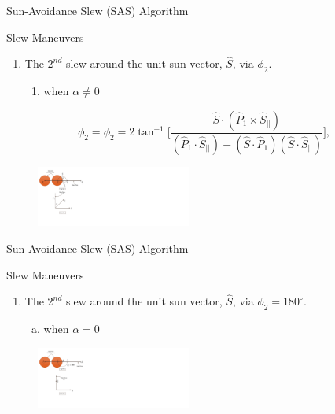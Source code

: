 \documentclass{beamer}
\begin{document}
\begin{frame}{Sun-Avoidance Slew (SAS) Algorithm}
\begin{block}{Slew Maneuvers}
\begin{enumerate}[2]
\item The $2^{nd}$ slew around the unit sun vector, $\hat{S}$, via $\phi_2$.
\begin{enumerate}[a]
\item when $\alpha\neq0$
\end{enumerate}
\end{enumerate}
\begin{equation}
\phi_2=\phi_2=2\tan^{-1}\Big[ \frac{\hat{S}\cdot (\hat{P}_1\times\hat{S}_{||})}{(\hat{P}_1\cdot\hat{S}_{||})-(\hat{S}\cdot\hat{P}_1)(\hat{S}\cdot\hat{S}_{||})}\Big],
\end{equation}
\begin{figure}
\includegraphics[width=2in]{./Figures/SVAS_2r_modified}
\end{figure}
\end{block}
\end{frame}
\begin{frame}{Sun-Avoidance Slew (SAS) Algorithm}
\begin{block}{Slew Maneuvers}
\begin{enumerate}[2]
\item The $2^{nd}$ slew around the unit sun vector, $\hat{S}$, via $\phi_2=180^{\circ}$.
\begin{enumerate}[b)]
\item when $\alpha=0$
\end{enumerate}
\end{enumerate}
\begin{figure}
\includegraphics[width=2in]{./Figures/SVAS_3r_modified}
\end{figure}
\end{block}
\end{frame}
\end{document}
